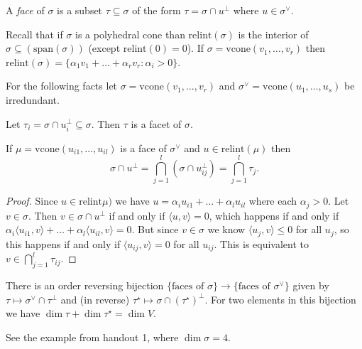 \documentclass[a4paper,12pt]{amsart}
\begin{document}
\begin{Def}
A \emph{face} of $\sigma$ is a subset $\tau \subseteq \sigma$ of the form $\tau = \sigma \cap u^\perp$ where $u \in \sigma^\vee$.
\end{Def}

Recall that if $\sigma$ is a polyhedral cone than $\mathrm{rel int}(\sigma)$ is the interior of $\sigma \subseteq(\mathrm{span}(\sigma))$ (except $\mathrm{rel int}(0) = 0$).
If $\sigma = \mathrm{vcone}(v_1, \dots, v_r)$ then $\mathrm{rel int}(\sigma) = \{\alpha_1v_1 + \dots + \alpha_rv_r : \alpha_i > 0\}$.

For the following facts let $\sigma = \mathrm{vcone}(v_1, \dots, v_r)$ and $\sigma^\vee = \mathrm{vcone}(u_1, \dots, u_s)$ be irredundant.

\begin{Fact}
Let $\tau_i = \sigma \cap u_i^\perp \subseteq \sigma$.
Then $\tau$ is a facet of $\sigma$.
\end{Fact}

\begin{Fact}
If $\mu = \mathrm{vcone}(u_{i1}, \dots, u_{il})$ is a face of $\sigma^\vee$ and $u \in \mathrm{rel int}(\mu)$ then
\[
\sigma \cap u^\perp = \bigcap_{j=1}^l(\sigma \cap u_{ij}^\perp) = \bigcap_{j=1}^l \tau_j.
\]
\end{Fact}

\begin{proof}
Since $u \in \mathrm{rel int}\mu)$ we have $u = \alpha_iu_{i1} + \dots + \alpha_lu_{il}$ where each $\alpha_j > 0$.
Let $v \in \sigma$.
Then $v \in \sigma \cap u^\perp$ if and only if $\langle u, v \rangle = 0$, which happens if and only if $\alpha_i\langle u_{i1}, v \rangle + \dots + \alpha_l\langle u_{il}, v \rangle = 0$.
But since $v \in \sigma$ we know $\langle u_j, v \rangle \le 0$ for all $u_j$, so this happens if and only if $\langle u_{ij}, v \rangle = 0$ for all $u_{ij}$.
This is equivalent to $v \in \bigcap_{j=1}^l \tau_{ij}$.
\end{proof}

\begin{Fact}
There is an order reversing bijection $\{\text{faces of $\sigma$}\} \to \{\text{faces of $\sigma^\vee$}\}$ given by $\tau \mapsto \sigma^\vee \cap \tau^\perp$ and (in reverse) $\tau^\star \mapsto \sigma \cap (\tau^\star)^\perp$.
For two elements in this bijection we have $\dim \tau + \dim \tau^\star = \dim V$.
\end{Fact}

\begin{Eg}
See the example from handout 1, where $\dim \sigma = 4$.
\end{Eg}
\end{document}
